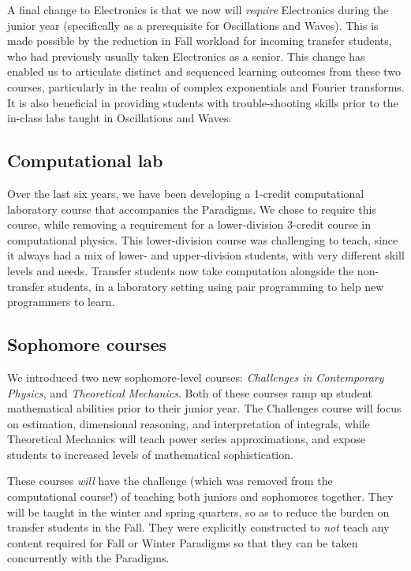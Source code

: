 \documentclass[english,aps,pra,reprint,noshowpacs,superscriptaddress]{revtex4-1}
\begin{document}
A final change to Electronics is that we now will \emph{require}
Electronics during the junior year (specifically as a prerequisite for
Oscillations and Waves).  This is made possible by the reduction in
Fall workload for incoming transfer students, who had previously
usually taken Electronics as a senior.  This change has enabled us to
articulate distinct and sequenced learning outcomes from these two
courses, particularly in the realm of complex exponentials and Fourier
transforms.  It is also beneficial in providing students with
trouble-shooting skills prior to the in-class labs taught in
Oscillations and Waves.

\subsection{Computational lab}
Over the last six years, we have been developing a 1-credit
computational laboratory course that accompanies the Paradigms.  We
chose to require this course, while removing a requirement for a
lower-division 3-credit course in computational physics.  This
lower-division course was challenging to teach, since it always had a
mix of lower- and upper-division students, with very different skill
levels and needs.  Transfer students now take computation alongside
the non-transfer students, in a laboratory setting using pair
programming to help new programmers to learn.

\subsection{Sophomore courses}
We introduced two new sophomore-level courses: \emph{Challenges in
  Contemporary Physics}, and \emph{Theoretical Mechanics}.  Both of
these courses ramp up student mathematical abilities prior to their
junior year.  The Challenges course will focus on estimation,
dimensional reasoning, and interpretation of integrals, while
Theoretical Mechanics will teach power series approximations, and
expose students to increased levels of mathematical sophistication.

These courses \emph{will} have the challenge (which was removed from
the computational course!) of teaching both juniors and sophomores
together.  They will be taught in the winter and spring quarters, so
as to reduce the burden on transfer students in the Fall.  They were
explicitly constructed to \emph{not} teach any content required for
Fall or Winter Paradigms so that they can be taken concurrently with
the Paradigms.
\end{document}
